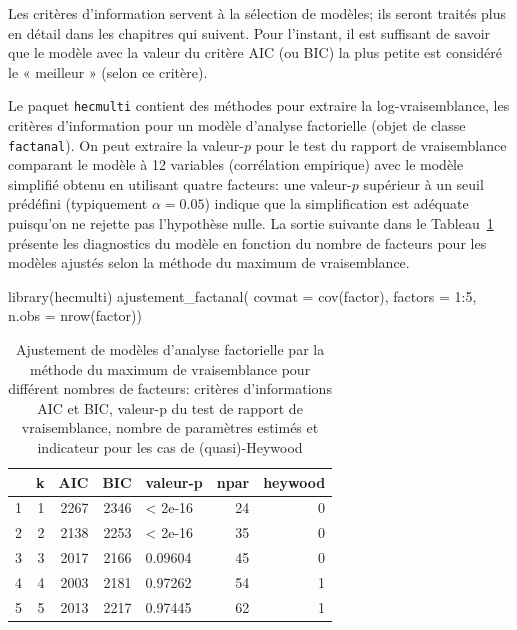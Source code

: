 \documentclass[
  11pt,
  letterpaper,
]{book}
\newenvironment{Shaded}{\begin{snugshade}}{\end{snugshade}}
\newcommand{\AttributeTok}[1]{\textcolor[rgb]{0.40,0.45,0.13}{#1}}
\newcommand{\DecValTok}[1]{\textcolor[rgb]{0.68,0.00,0.00}{#1}}
\newcommand{\FunctionTok}[1]{\textcolor[rgb]{0.28,0.35,0.67}{#1}}
\newcommand{\NormalTok}[1]{\textcolor[rgb]{0.00,0.23,0.31}{#1}}
\newcommand{\SpecialCharTok}[1]{\textcolor[rgb]{0.37,0.37,0.37}{#1}}
\theoremstyle{definition}
\theoremstyle{remark}
\begin{document}
Les critères d'information servent à la sélection de modèles; ils seront
traités plus en détail dans les chapitres qui suivent. Pour l'instant,
il est suffisant de savoir que le modèle avec la valeur du critère AIC
(ou BIC) la plus petite est considéré le « meilleur » (selon ce
critère).

Le paquet \texttt{hecmulti} contient des méthodes pour extraire la
log-vraisemblance, les critères d'information pour un modèle d'analyse
factorielle (objet de classe \texttt{factanal}). On peut extraire la
valeur-\(p\) pour le test du rapport de vraisemblance comparant le
modèle à 12 variables (corrélation empirique) avec le modèle simplifié
obtenu en utilisant quatre facteurs: une valeur-\(p\) supérieur à un
seuil prédéfini (typiquement \(\alpha=0.05\)) indique que la
simplification est adéquate puisqu'on ne rejette pas l'hypothèse nulle.
La sortie suivante dans le Tableau~\ref{tbl-emvcrit} présente les
diagnostics du modèle en fonction du nombre de facteurs pour les modèles
ajustés selon la méthode du maximum de vraisemblance.

\begin{Shaded}
\begin{Highlighting}[]
\FunctionTok{library}\NormalTok{(hecmulti)}
\FunctionTok{ajustement\_factanal}\NormalTok{(}
    \AttributeTok{covmat =} \FunctionTok{cov}\NormalTok{(factor),}
    \AttributeTok{factors =} \DecValTok{1}\SpecialCharTok{:}\DecValTok{5}\NormalTok{,}
    \AttributeTok{n.obs =} \FunctionTok{nrow}\NormalTok{(factor))}
\end{Highlighting}
\end{Shaded}

\hypertarget{tbl-emvcrit}{}
\begin{table}
\caption{\label{tbl-emvcrit}Ajustement de modèles d'analyse factorielle par la méthode du maximum de
vraisemblance pour différent nombres de facteurs: critères
d'informations AIC et BIC, valeur-p du test de rapport de vraisemblance,
nombre de paramètres estimés et indicateur pour les cas de
(quasi)-Heywood }\tabularnewline

\centering
\begin{tabular}{lrrrlrr}
\toprule
  & k & AIC & BIC & valeur-p & npar & heywood\\
\midrule
1 & 1 & 2267 & 2346 & < 2e-16 & 24 & 0\\
2 & 2 & 2138 & 2253 & < 2e-16 & 35 & 0\\
3 & 3 & 2017 & 2166 & 0.09604 & 45 & 0\\
4 & 4 & 2003 & 2181 & 0.97262 & 54 & 1\\
5 & 5 & 2013 & 2217 & 0.97445 & 62 & 1\\
\bottomrule
\end{tabular}
\end{table}
\end{document}

